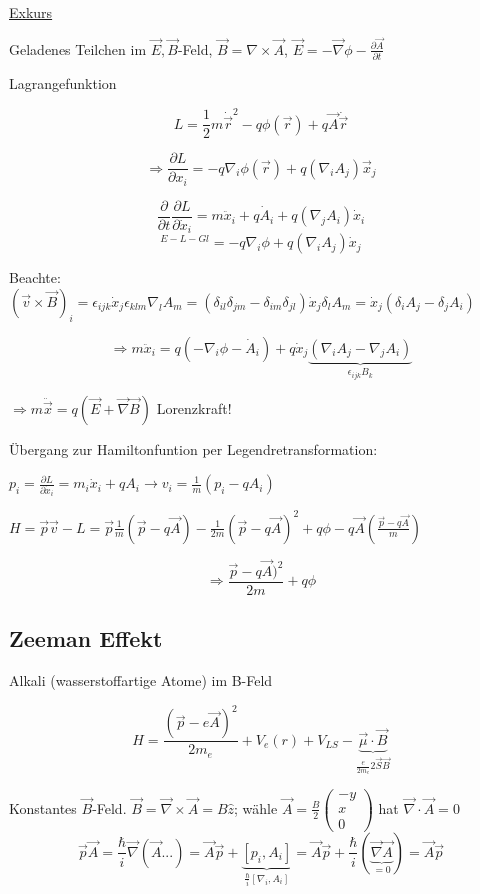 \underline{Exkurs}

Geladenes Teilchen im \(\vec E,\vec B\)-Feld, \(\vec B = \nabla \times \vec A\), \(\vec E = -\vec \nabla \phi - \frac{\partial \vec A}{\partial t}\)

Lagrangefunktion

\[ L = \frac{1}{2} m \dot {\vec r}^2 - q\phi(\vec r) + q\vec A\dot{\vec r}\]

\[\Rightarrow \frac{\partial L}{\partial x_i}=-q\nabla_i\phi(\vec r) + q(\nabla_iA_j)\vec x_j\]

\[ \frac{\partial}{\partial t}\frac{\partial L}{\partial \dot x_i} = m\ddot x_i + q \dot A_i + q(\nabla_jA_i)\dot x_i\]
\[ ^{E-L-Gl}= -q\nabla_i\phi+q(\nabla_iA_j)\dot x_j\]

Beachte: \((\vec v\times \vec B)_i = \epsilon_{ijk}\dot x_j \epsilon_{klm}\nabla_lA_m = (\delta_{il}\delta_{jm}-\delta_{im}\delta_{jl})\dot x_j\delta_lA_m = \dot x_j(\delta_iA_j - \delta_jA_i)\)


\[\Rightarrow m\ddot x_i = q(-\nabla_i\phi - \dot A_i)+q\dot x_j\underbrace{(\nabla_iA_j-\nabla_jA_i)}_{\epsilon_{ijk}B_k}\]


\(\Rightarrow m\ddot{\vec x} = q(\vec E + \vec \nabla \vec B)\) Lorenzkraft!

Übergang zur Hamiltonfuntion per Legendretransformation:

\(p_i = \frac{\partial L}{\partial \dot x_i} = m_i \dot x_i + q A_i \rightarrow v_i = \frac{1}{m}(p_i-qA_i)\)

\(H = \vec p \vec v - L = \vec p \frac{1}{m}(\vec p - q \vec A) -\frac{1}{2m}(\vec p - q \vec A)^2+q\phi-q\vec A(\frac{\vec p - q \vec A}{m})\)

\[\Rightarrow \frac{\vec p - q\vec A)^2}{2m}+q\phi\]



\subsection{Zeeman Effekt}

Alkali (wasserstoffartige Atome) im B-Feld

\[ H= \frac{(\vec p - e\vec A)^2}{2m_e}+V_e(r) + V_{LS}-\underbrace{\vec \mu\cdot \vec B}_{\frac{e}{2m_e}2\vec S\vec B}\]

Konstantes \(\vec B\)-Feld. \(\vec B = \vec \nabla \times \vec A = B\hat z\); wähle \(\vec A = \frac{B}{2}\begin{pmatrix} -y \\ x \\ 0 \end{pmatrix}\) hat \(\vec \nabla\cdot \vec A=0\)
\[ \vec p \vec A = \frac{\hbar}{i}\vec \nabla (\vec A...) = \vec A\vec p + \underbrace{[p_i,A_i]}_{\frac{\hbar}{i}[\nabla_i,A_i]}=\vec A\vec p + \frac{\hbar}{i}(\underbrace{\vec \nabla\vec A}_{=0})=\vec A\vec p\]

